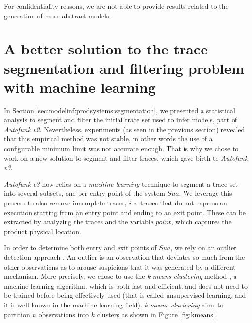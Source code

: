 For confidentiality reasons, we are not able to provide results
related to the generation of more abstract models.


\section{A better solution to the trace segmentation and
filtering problem with machine learning}
\label{sec:modelinf:prodsystems:better-segmentation}

In Section \ref{sec:modelinf:prodsystems:segmentation}, we
presented a statistical analysis to segment and filter the
initial trace set used to infer models, part of \emph{Autofunk
v2}. Nevertheless, experiments (as seen in the previous section)
revealed that this empirical method was not stable, in other
words the use of a configurable minimum limit was not accurate
enough. That is why we chose to work on a new solution to segment
and filter traces, which gave birth to \emph{Autofunk v3}.

\emph{Autofunk v3} now relies on a \emph{machine learning}
technique to segment a trace set into several subsets, one per
entry point of the system $\mathit{Sua}$. We leverage this
process to also remove incomplete traces, \emph{i.e.} traces that
do not express an execution starting from an entry point and
ending to an exit point. These can be extracted by analyzing the
traces and the variable $point$, which captures the product
physical location.

In order to determine both entry and exit points of
$\mathit{Sua}$, we rely on an outlier detection approach
\cite{1695852}. An outlier is an observation that deviates so
much from the other observations as to arouse suspicions that it
was generated by a different mechanism. More precisely, we chose
to use the \emph{k-means clustering} method
\cite{10.2307/2346830}, a machine learning algorithm, which is
both fast and efficient, and does not need to be trained before
being effectively used (that is called unsupervised learning, and
it is well-known in the machine learning field). \textit{k-means
clustering} aims to partition $n$ observations into $k$ clusters
as shown in Figure \ref{fig:kmeans}.

